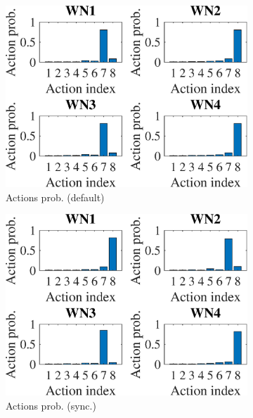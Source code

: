 \documentclass[preprint,12pt]{article}
\begin{document}
\begin{figure}[h!]
	\centering
	\begin{subfigure}[b]{.3\textwidth}
		\includegraphics[width=\textwidth]{images/actions_probability_TS}
		\caption{Actions prob. (default)}\label{fig:actions_probability_TS}
	\end{subfigure}
	\begin{subfigure}[b]{.3\textwidth}
		\includegraphics[width=\textwidth]{images/actions_probability_OTS}
		\caption{Actions prob. (sync.)}\label{fig:actions_probability_OTS}
	\end{subfigure}
	\begin{subfigure}[b]{.3\textwidth}

\end{subfigure}
\end{figure}
\end{document}
